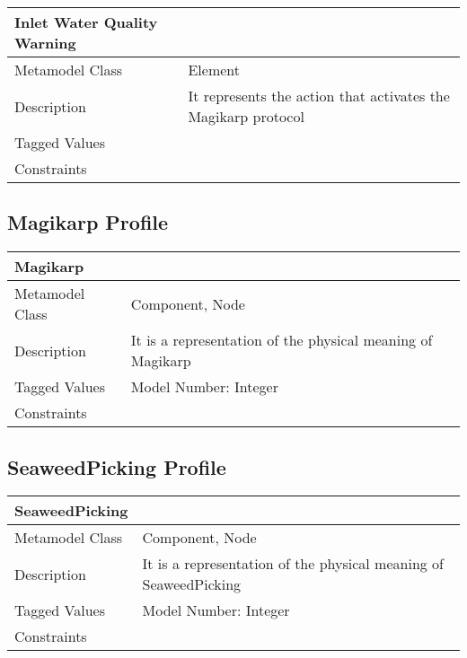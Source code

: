\begin{longtable}{|p{7cm}|p{7cm}|}

\hline
\textbf{Inlet Water Quality Warning} & \\


\hline
Metamodel Class & Element\\

\hline
Description & It represents the action that activates the Magikarp protocol\\

\hline
Tagged Values &\\

\hline
Constraints &\\

\hline
\end{longtable}

\subsection{Magikarp Profile}

\begin{longtable}{|p{7cm}|p{7cm}|}

\hline
\textbf{Magikarp} & \\


\hline
Metamodel Class & Component, Node\\

\hline
Description & It is a representation of the physical meaning of Magikarp\\

\hline
Tagged Values & Model Number: Integer\\

\hline
Constraints &\\

\hline
\end{longtable}

\subsection{SeaweedPicking Profile}

\begin{longtable}{|p{7cm}|p{7cm}|}

\hline
\textbf{SeaweedPicking} & \\


\hline
Metamodel Class & Component, Node\\

\hline
Description & It is a representation of the physical meaning of SeaweedPicking\\

\hline
Tagged Values & Model Number: Integer\\

\hline
Constraints &\\

\hline
\end{longtable}

